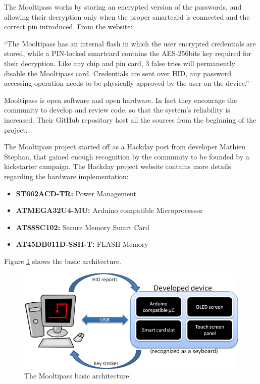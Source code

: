 The Mooltipass works by storing an encrypted version of the passwords, and allowing their decryption only when the proper smartcard is connected and the correct pin introduced. From the website:

``The Mooltipass has an internal flash in which the user encrypted credentials are stored, while a PIN-locked smartcard contains the AES-256bits key required for their decryption. Like any chip and pin card, 3 false tries will permanently disable the Mooltipass card. Credentials are sent over HID, any password accessing operation needs to be physically approved by the user on the device.''

Mooltipass is open software and open hardware. In fact they encourage the community to develop and review code, so that the system's reliability is increased. Their GitHub repository host all the sources from the beginning of the project. \cite{mpgit}.

The Mooltipass project started off as a Hackday post from developer Mathieu Stephan, that gained enough recognition by the community to be founded by a kickstarter campaign. The Hackday project website \cite{mphack} contains more details regarding the hardware implementation:

\begin{itemize}
\setlength\itemsep{-3pt}

\item \textbf{ST662ACD-TR:} Power Management
\item \textbf{ATMEGA32U4-MU:} Arduino compatible Microprocessor
\item \textbf{AT88SC102:} Secure Memory Smart Card
\item \textbf{AT45DB011D-SSH-T:} FLASH Memory
\end{itemize}

Figure \ref{fig:mparchi} shows the basic architecture.
\begin{figure}[htb]
  \centering
  \captionsetup{justification=centering}
  \centerline{\includegraphics[width=0.9\columnwidth]{chapters/figures/related/mparchi.png}}
  \caption{The Mooltipass basic architecture}
  \label{fig:mparchi}
\end{figure}

